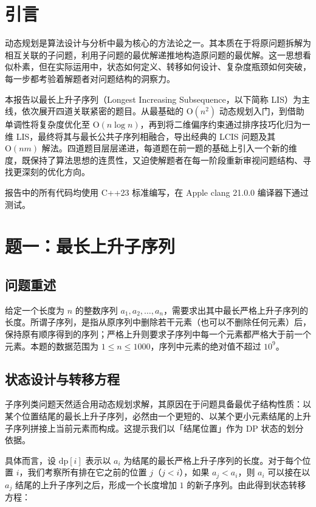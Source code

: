 \documentclass[12pt, a4paper]{academics}
\begin{document}
\makeacademicscover

\section{引言}

动态规划是算法设计与分析中最为核心的方法论之一。其本质在于将原问题拆解为相互关联的子问题，利用子问题的最优解递推地构造原问题的最优解。这一思想看似朴素，但在实际运用中，状态如何定义、转移如何设计、复杂度瓶颈如何突破，每一步都考验着解题者对问题结构的洞察力。

本报告以最长上升子序列（Longest Increasing Subsequence，以下简称 LIS）为主线，依次展开四道关联紧密的题目。从最基础的 $\mathrm{O}(n^2)$ 动态规划入门，到借助单调性将复杂度优化至 $\mathrm{O}(n \log n)$，再到将二维偏序约束通过排序技巧化归为一维 LIS，最终将其与最长公共子序列相融合，导出经典的 LCIS 问题及其 $\mathrm{O}(nm)$ 解法。四道题目层层递进，每道题在前一题的基础上引入一个新的维度，既保持了算法思想的连贯性，又迫使解题者在每一阶段重新审视问题结构、寻找更深刻的优化方向。

报告中的所有代码均使用 C++23 标准编写，在 Apple clang 21.0.0 编译器下通过测试。

\section{题一：最长上升子序列}

\subsection{问题重述}

给定一个长度为 $n$ 的整数序列 $a_1, a_2, \dots, a_n$，需要求出其中最长严格上升子序列的长度。所谓子序列，是指从原序列中删除若干元素（也可以不删除任何元素）后，保持原有顺序得到的序列；严格上升则要求子序列中每一个元素都严格大于前一个元素。本题的数据范围为 $1 \le n \le 1000$，序列中元素的绝对值不超过 $10^9$。

\subsection{状态设计与转移方程}

子序列类问题天然适合用动态规划求解，其原因在于问题具备最优子结构性质：以某个位置结尾的最长上升子序列，必然由一个更短的、以某个更小元素结尾的上升子序列拼接上当前元素而构成。这提示我们以「结尾位置」作为 DP 状态的划分依据。

具体而言，设 $\mathrm{dp}[i]$ 表示以 $a_i$ 为结尾的最长严格上升子序列的长度。对于每个位置 $i$，我们考察所有排在它之前的位置 $j$（$j < i$），如果 $a_j < a_i$，则 $a_i$ 可以接在以 $a_j$ 结尾的上升子序列之后，形成一个长度增加 $1$ 的新子序列。由此得到状态转移方程：
\end{document}
